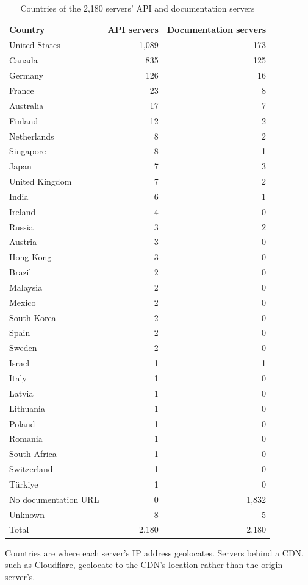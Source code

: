 \begin{table}[htbp]
  \centering
  \caption{Countries of the 2,180 servers' API and documentation servers}
  \label{tab:servers-countries}
  \begin{tabular}{lrr}
    \toprule
    Country & API servers & Documentation servers \\
    \midrule
    United States & 1,089 & 173 \\
    Canada & 835 & 125 \\
    Germany & 126 & 16 \\
    France & 23 & 8 \\
    Australia & 17 & 7 \\
    Finland & 12 & 2 \\
    Netherlands & 8 & 2 \\
    Singapore & 8 & 1 \\
    Japan & 7 & 3 \\
    United Kingdom & 7 & 2 \\
    India & 6 & 1 \\
    Ireland & 4 & 0 \\
    Russia & 3 & 2 \\
    Austria & 3 & 0 \\
    Hong Kong & 3 & 0 \\
    Brazil & 2 & 0 \\
    Malaysia & 2 & 0 \\
    Mexico & 2 & 0 \\
    South Korea & 2 & 0 \\
    Spain & 2 & 0 \\
    Sweden & 2 & 0 \\
    Israel & 1 & 1 \\
    Italy & 1 & 0 \\
    Latvia & 1 & 0 \\
    Lithuania & 1 & 0 \\
    Poland & 1 & 0 \\
    Romania & 1 & 0 \\
    South Africa & 1 & 0 \\
    Switzerland & 1 & 0 \\
    Türkiye & 1 & 0 \\
    No documentation URL & 0 & 1,832 \\
    Unknown & 8 & 5 \\
    \midrule
    Total & 2,180 & 2,180 \\
    \bottomrule
  \end{tabular}

  \smallskip
  \footnotesize Countries are where each server's IP address geolocates. Servers behind a CDN, such as
  Cloudflare, geolocate to the CDN's location rather than the origin server's.
\end{table}
